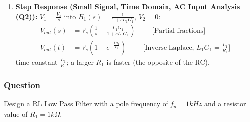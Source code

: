 \begin{enumerate}
      \paragraph{At Output:} (looking in from \(V_{out}\) with both sources
      shorted, \(R_1\) and \(L_1\) are in parallel)
        \begin{align*}
          Z_{out} &= R_1 \parallel s L_1 \\
          Z_{out} &= \frac{R_1 \cdot j \omega L_1}{R_1 + j \omega L_1} \\
          Z_{out} &= \frac{R_1 j \omega L_1 (R_1 - j \omega L_1)}{(R_1 + j \omega L_1)(R_1 - j \omega L_1)} \hspace{1cm} \text{(Multiplying by the conjugate)} \\
          Z_{out} &= \frac{j \omega R_1^2 L_1 - j^2 \omega^2 R_1 L_1^2}{R_1^2 - (j \omega L_1)^2} \\
          Z_{out} &= \frac{j \omega R_1^2 L_1 + \omega^2 R_1 L_1^2}{R_1^2 + (\omega L_1)^2} \hspace{1cm} \text{(\(j^2 = -1\))} \\
          Z_{out} &= \frac{\omega^2 R_1 L_1^2}{R_1^2 + (\omega L_1)^2} + j \frac{\omega R_1^2 L_1}{R_1^2 + (\omega L_1)^2}
        \end{align*}
  \item \textbf{Step Response (Small Signal, Time Domain, AC Input Analysis (Q2)):}
    \(V_1 = \frac{V_s}{s}\) into \(H_1(s) = \frac{1}{1 + sL_1G_1}\), \(V_2 = 0\):
    \begin{align*}
      V_{out}(s) &= V_s\left(\frac{1}{s} - \frac{L_1G_1}{1 + sL_1G_1}\right) \hspace{1cm} \text{[Partial fractions]} \\
      V_{out}(t) &= V_s\left(1 - e^{-\frac{tR_1}{L_1}}\right) \hspace{1cm} \text{[Inverse Laplace, } L_1G_1 = \tfrac{L_1}{R_1}\text{]}
    \end{align*}
    time constant \(\frac{L_1}{R_1}\); a larger \(R_1\) is faster (the opposite of the RC).
\end{enumerate}

\subsubsection{Question}
Design a RL Low Pass Filter with a pole frequency of
\(f_p = 1 kHz\) and a resistor value of \(R_1 = 1 k\Omega\).
